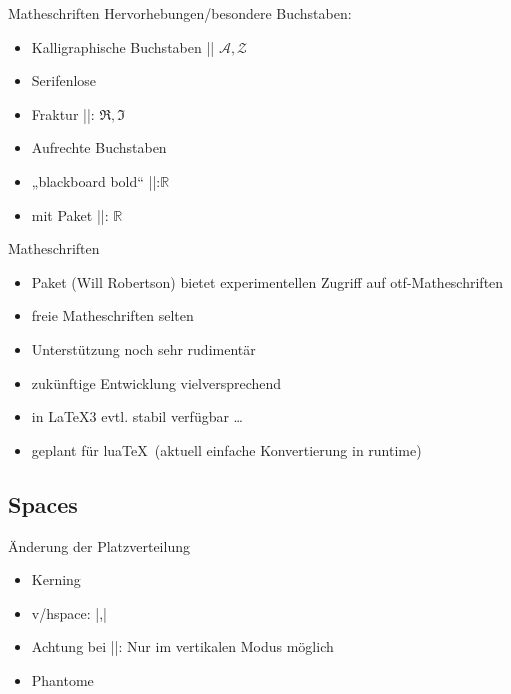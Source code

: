 \documentclass[
	vorläufig=false,
	datum=2022-11-02,
	titel={Mathematiksatz II},
	web=true,
	max,
	aspectratio=1610,
]{../tex/latexkurs-slides}
\begin{document}
\begin{frame}[fragile]{Matheschriften}
Hervorhebungen/besondere Buchstaben:
\begin{itemize}
\item Kalligraphische Buchstaben |\mathcal| \hfill $\mathcal{A}, \mathcal{Z}$
\item Serifenlose
\item Fraktur |\Re \Im|: \hfill $\Re, \Im$
\item Aufrechte Buchstaben
\item „blackboard bold“ ||:\hfill $\mathbb R$
\item mit Paket  ||: \hfill$\mathds{R}$
\end{itemize} 
\end{frame}

\begin{frame}[fragile]{Matheschriften}
\begin{itemize}
\item Paket  (Will Robertson) bietet experimentellen Zugriff auf otf-Matheschriften
\item freie Matheschriften selten
\item Unterstützung noch sehr rudimentär
\item zukünftige Entwicklung vielversprechend
\item in \LaTeX3 evtl. stabil verfügbar \dots
\item geplant für lua\TeX \, (aktuell einfache Konvertierung in runtime)
\end{itemize}
\end{frame}


\subsection{Spaces}
\begin{frame}[fragile]{Änderung der Platzverteilung}
\begin{itemize}
\item Kerning
\item v/hspace: |\hspace{1cm},\hspace*{1cm}|
\item Achtung bei |\vspace|: Nur im vertikalen Modus möglich
\item Phantome
\end{itemize}
\end{frame}
\end{document}
